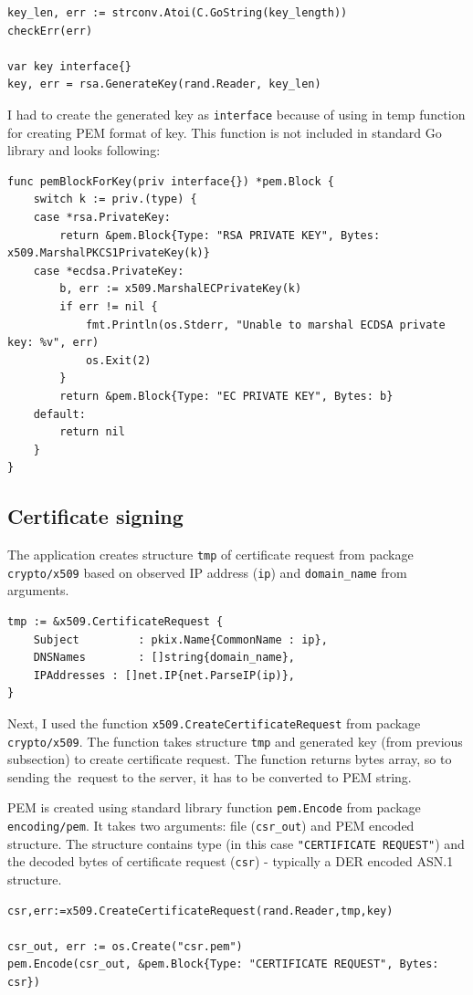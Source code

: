\documentclass[
  12pt, 
  digital, %
  notable,   %
  nolof,     %
  nolot,     %
]{fithesis3}
\begin{document}
\begin{lstlisting}
key_len, err := strconv.Atoi(C.GoString(key_length))	
checkErr(err)

var key interface{}
key, err = rsa.GenerateKey(rand.Reader, key_len)
\end{lstlisting}
I had to create the generated key as \texttt{interface} because of using in temp function for 
creating PEM format of key. This function is not included in standard Go library and looks 
following:
\begin{lstlisting}
func pemBlockForKey(priv interface{}) *pem.Block {
	switch k := priv.(type) {
	case *rsa.PrivateKey:
		return &pem.Block{Type: "RSA PRIVATE KEY", Bytes: x509.MarshalPKCS1PrivateKey(k)}
	case *ecdsa.PrivateKey:
		b, err := x509.MarshalECPrivateKey(k)
		if err != nil {
			fmt.Println(os.Stderr, "Unable to marshal ECDSA private key: %v", err)
			os.Exit(2)
		}
		return &pem.Block{Type: "EC PRIVATE KEY", Bytes: b}
	default:
		return nil
	}
}
\end{lstlisting}

\subsection{Certificate signing}

The application creates structure \texttt{tmp} of certificate request from package 
\texttt{crypto/x509} based on observed IP address (\texttt{ip}) and \texttt{domain\_name} from 
arguments. \pagebreak
\begin{lstlisting}
tmp := &x509.CertificateRequest {
	Subject 		: pkix.Name{CommonName : ip},
	DNSNames 		: []string{domain_name},
	IPAddresses : []net.IP{net.ParseIP(ip)},
}
\end{lstlisting}
Next, I used the function \texttt{x509.CreateCertificateRequest} from package \texttt{crypto/x509}. The function takes structure \texttt{tmp} and generated key (from previous 
subsection) to create certificate request. The function returns bytes array, so to sending 
the~request to the server, it has to be converted to PEM string.

PEM is created using standard library function \texttt{pem.Encode} from package \texttt{encoding/pem}. It takes two arguments: file (\texttt{csr\_out}) and PEM encoded structure. The structure contains type (in this case \texttt{"CERTIFICATE REQUEST"}) and the decoded bytes of certificate request (\texttt{csr}) - typically a DER encoded ASN.1 structure. 
\begin{lstlisting}
csr,err:=x509.CreateCertificateRequest(rand.Reader,tmp,key)

csr_out, err := os.Create("csr.pem")
pem.Encode(csr_out, &pem.Block{Type: "CERTIFICATE REQUEST", Bytes: csr})
\end{lstlisting}
\end{document}
